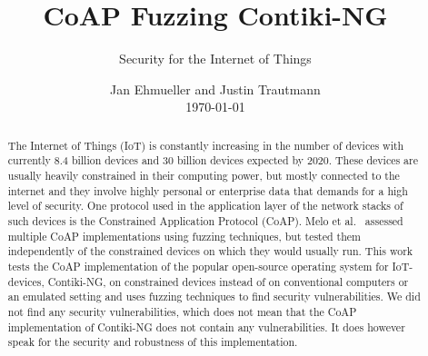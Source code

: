 \documentclass[sigconf]{acmart}
\begin{document}
\title{CoAP Fuzzing Contiki-NG}
\subtitle{Security for the Internet of Things}

\author{Jan Ehmueller and Justin Trautmann \\ \today}

\begin{abstract}
The Internet of Things (IoT) is constantly increasing in the number of devices with currently 8.4 billion devices and 30 billion devices expected by 2020. These devices are usually heavily constrained in their computing power, but mostly connected to the internet and they involve highly personal or enterprise data that demands for a high level of security. One protocol used in the application layer of the network stacks of such devices is the Constrained Application Protocol (CoAP).
Melo et al.~\cite{Melo2017RobustnessTO} assessed multiple CoAP implementations using fuzzing techniques, but tested them independently of the constrained devices on which they would usually run. This work tests the CoAP implementation of the popular open-source operating system for IoT-devices, Contiki-NG, on constrained devices instead of on conventional computers or an emulated setting and uses fuzzing techniques to find security vulnerabilities.
We did not find any security vulnerabilities, which does not mean that the CoAP implementation of Contiki-NG does not contain any vulnerabilities. It does however speak for the security and robustness of this implementation.
\end{abstract}

\maketitle

\glsresetall









\balance



\end{document}
